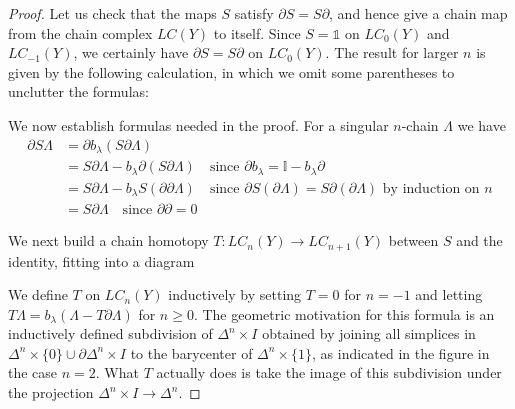 \begin{proof}
Let us check that the maps $S$ satisfy $\partial S = S\partial$, and hence give a chain map from the chain complex $LC(Y)$ to itself. Since $S = \mathbb{1}$ on $LC_0(Y)$ and $LC_{-1}(Y)$, we certainly have $\partial S = S\partial$ on $LC_0(Y)$. The result for larger $n$ is given by the following calculation, in which we omit some parentheses to unclutter the formulas:


We now establish formulas needed in the proof. For a singular $n$-chain $\Lambda$ we have
\begin{align*}
\partial S\Lambda &= \partial b_\lambda(S\partial\Lambda)\\
&= S\partial\Lambda - b_\lambda\partial(S\partial\Lambda) \quad \text{since } \partial b_\lambda = \mathbb{I} - b_\lambda\partial\\
&= S\partial\Lambda - b_\lambda S(\partial\partial\Lambda) \quad \text{since } \partial S(\partial\Lambda) = S\partial(\partial\Lambda) \text{ by induction on } n\\
&= S\partial\Lambda \quad \text{since } \partial\partial = 0
\end{align*}

We next build a chain homotopy $T:LC_n(Y)\to LC_{n+1}(Y)$ between $S$ and the identity, fitting into a diagram


We define $T$ on $LC_n(Y)$ inductively by setting $T = 0$ for $n = -1$ and letting $T\Lambda = b_\lambda(\Lambda - T\partial\Lambda)$ for $n \geq 0$. The geometric motivation for this formula is an inductively defined subdivision of $\Delta^n\times I$ obtained by joining all simplices in $\Delta^n\times\{0\}\cup\partial\Delta^n\times I$ to the barycenter of $\Delta^n\times\{1\}$, as indicated in the figure in the case $n = 2$. What $T$ actually does is take the image of this subdivision under the projection $\Delta^n\times I\to\Delta^n$.


\end{proof}

